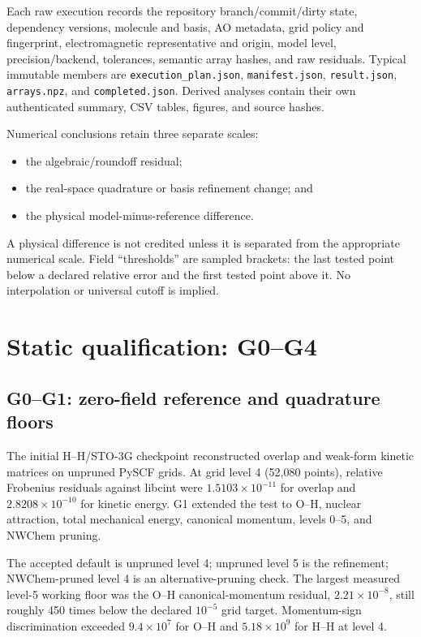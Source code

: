 \documentclass[11pt]{article}
\begin{document}
Each raw execution records the repository branch/commit/dirty state,
dependency versions, molecule and basis, AO metadata, grid policy and
fingerprint, electromagnetic representative and origin, model level,
precision/backend, tolerances, semantic array hashes, and raw residuals.
Typical immutable members are \texttt{execution\_plan.json},
\texttt{manifest.json}, \texttt{result.json}, \texttt{arrays.npz}, and
\texttt{completed.json}.  Derived analyses contain their own authenticated
summary, CSV tables, figures, and source hashes.

Numerical conclusions retain three separate scales:

\begin{itemize}
  \item the algebraic/roundoff residual;
  \item the real-space quadrature or basis refinement change; and
  \item the physical model-minus-reference difference.
\end{itemize}

A physical difference is not credited unless it is separated from the
appropriate numerical scale.  Field ``thresholds'' are sampled brackets: the
last tested point below a declared relative error and the first tested point
above it.  No interpolation or universal cutoff is implied.

\section{Static qualification: G0--G4}

\subsection{G0--G1: zero-field reference and quadrature floors}

The initial H--H/STO-3G checkpoint reconstructed overlap and weak-form kinetic
matrices on unpruned PySCF grids.  At grid level 4 (52,080 points), relative
Frobenius residuals against libcint were $1.5103\times10^{-11}$ for overlap
and $2.8208\times10^{-10}$ for kinetic energy.  G1 extended the test to O--H,
nuclear attraction, total mechanical energy, canonical momentum, levels
0--5, and NWChem pruning.

The accepted default is unpruned level 4; unpruned level 5 is the refinement;
NWChem-pruned level 4 is an alternative-pruning check.  The largest measured
level-5 working floor was the O--H canonical-momentum residual,
$2.21\times10^{-8}$, still roughly 450 times below the declared $10^{-5}$ grid
target.  Momentum-sign discrimination exceeded $9.4\times10^7$ for O--H and
$5.18\times10^9$ for H--H at level 4.
\end{document}
